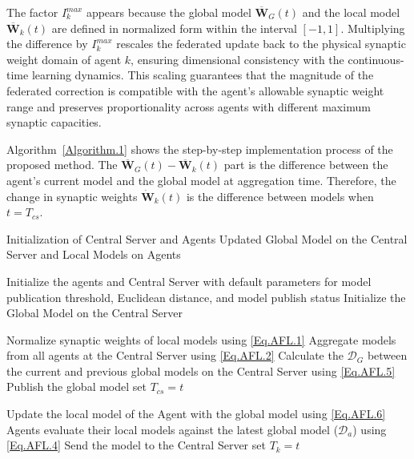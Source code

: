 The factor $I_{k}^{max}$ appears because the global model $\bm{\overline{W}}_{G}(t)$ and the local model $\bm{\overline{W}}_{k}(t)$ are defined in normalized form within the interval $[-1,1]$. Multiplying the difference by $I_{k}^{max}$ rescales the federated update back to the physical synaptic weight domain of agent $k$, ensuring dimensional consistency with the continuous-time learning dynamics. This scaling guarantees that the magnitude of the federated correction is compatible with the agent’s allowable synaptic weight range and preserves proportionality across agents with different maximum synaptic capacities.

Algorithm~\ref{Algorithm.1} shows the step-by-step implementation process of the proposed method. The \(\bm{\overline{W}}_{G}(t) - \bm{\overline{W}}_{k}(t)\) part is the difference between the agent's current model and the global model at aggregation time. Therefore, the change in synaptic weights \(\dot{\bm{W}}_{k}(t)\) is the difference between models when \(t=T_{cs}\).

\begin{algorithm} [H]
\caption{High-Level Algorithm for the Proposed \ac{fl} Algorithm}
\label{Algorithm.1}
\begin{algorithmic}[1]
\Require Initialization of Central Server and Agents
\Ensure Updated Global Model on the Central Server and Local Models on Agents

\State Initialize the agents and Central Server with default parameters for model publication threshold, Euclidean distance, and model publish status
\State Initialize the Global Model on the Central Server

    \State Normalize synaptic weights of local models using \eqref{Eq.AFL.1}
    \State Aggregate models from all agents at the Central Server using \eqref{Eq.AFL.2}
    \State Calculate the \(\mathcal{D}_{G}\) between the current and previous global models on the Central Server using \eqref{Eq.AFL.5}
        \State Publish the global model
        \State set \(T_{cs} = t\)
    \EndIf
    
            \State Update the local model of the Agent with the global model using \eqref{Eq.AFL.6}
        \Else
            \State Agents evaluate their local models against the latest global model (\(\mathcal{D}_{a}\)) using \eqref{Eq.AFL.4}
                \State Send the model to the Central Server
                \State set \(T_{k} = t\)
            \EndIf
        \EndIf
    \EndFor
\EndIf
\end{algorithmic}
\end{algorithm}

